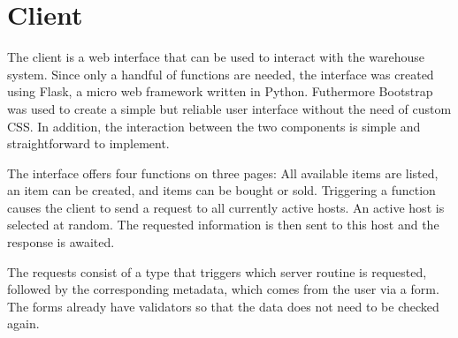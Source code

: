\section{Client}\label{sec:Client}
The client is a web interface that can be used to interact with the warehouse system.
Since only a handful of functions are needed, the interface was created using Flask, a micro web framework written in Python.
Futhermore Bootstrap was used to create a simple but reliable user interface without the need of custom CSS.
In addition, the interaction between the two components is simple and straightforward to implement.

The interface offers four functions on three pages: All available items are listed, an item can be created, and items can be bought or sold. 
Triggering a function causes the client to send a request to all currently active hosts. 
An active host is selected at random.
The requested information is then sent to this host and the response is awaited.

The requests consist of a type that triggers which server routine is requested, 
followed by the corresponding metadata, which comes from the user via a form. 
The forms already have validators so that the data does not need to be checked again.